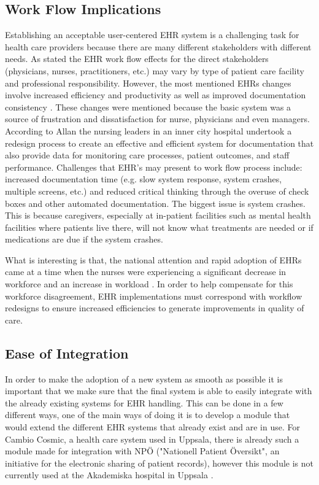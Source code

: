 \documentclass[14pt]{article}
\begin{document}
\subsection{Work Flow Implications}
\label{sec:peopleWorkflow}
Establishing an acceptable user-centered EHR system is a challenging task for health care providers because there are many different stakeholders with different needs. As stated the EHR work flow effects for the direct stakeholders (physicians, nurses, practitioners, etc.) may vary by type of patient care facility and professional responsibility. However, the most mentioned EHRs changes involve increased efficiency and productivity as well as improved documentation consistency \cite{Allan}. These changes were mentioned because the basic system was a source of frustration and dissatisfaction for nurse, physicians and even managers. According to Allan \cite{Allan} the nursing leaders in an inner city hospital undertook a redesign process to create an effective and efficient system for documentation that also provide data for monitoring care processes, patient outcomes, and staff performance. Challenges that EHR's may present to work flow process include: increased documentation time (e.g. slow system response, system crashes, multiple screens, etc.) and reduced critical thinking through the overuse of check boxes and other automated documentation. The biggest issue is system crashes. This is because caregivers, especially at in-patient facilities such as mental health facilities where patients live there, will not know what treatments are needed or if medications are due if the system crashes. 

What is interesting is that, the national attention and rapid adoption of EHRs came at a time when the nurses were experiencing a significant decrease in workforce and an increase in workload \cite{Mitre}. In order to help compensate for this workforce disagreement, EHR implementations must correspond with workflow redesigns to ensure increased efficiencies to generate improvements in quality of care. 

\subsection{Ease of Integration}
In order to make the adoption of a new system as smooth as possible it is important that we make sure that the final system is able to easily integrate with the already existing systems for EHR handling. This can be done in a few different ways, one of the main ways of doing it is to develop a module that would extend the different EHR systems that already exist and are in use.\cite{EPJ2} For Cambio Cosmic, a health care system used in Uppsala, there is already such a module made for integration with NPÖ ("Nationell Patient Översikt", an initiative for the electronic sharing of patient records), however this module is not currently used at the Akademiska hospital in Uppsala \cite{EPJ1}.
\end{document}
